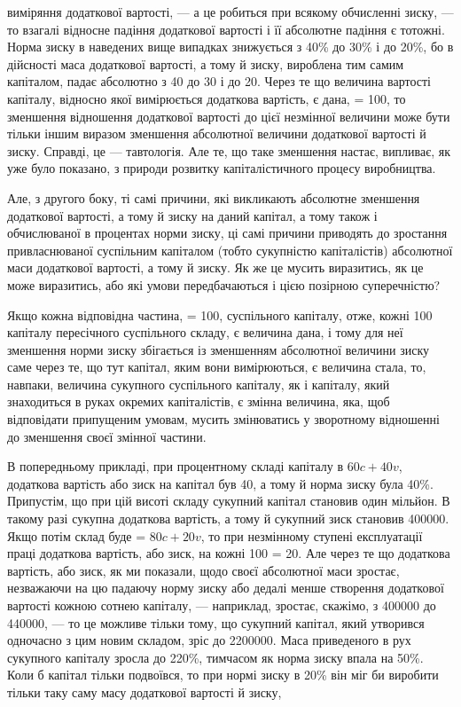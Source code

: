 \parcont{}  %
виміряння додаткової вартості, — а це робиться при всякому
обчисленні зиску, — то взагалі відносне падіння додаткової вартості
і її абсолютне падіння є тотожні. Норма зиску в наведених
вище випадках знижується з 40\% до 30\% і до 20\%, бо в дійсності
маса додаткової вартості, а тому й зиску, вироблена тим
самим капіталом, падає абсолютно з 40 до 30 і до 20. Через те
що величина вартості капіталу, відносно якої вимірюється додаткова
вартість, є дана, = 100, то зменшення відношення додаткової
вартості до цієї незмінної величини може бути тільки іншим
виразом зменшення абсолютної величини додаткової вартості
й зиску. Справді, це — тавтологія. Але те, що таке зменшення
настає, випливає, як уже було показано, з природи розвитку
капіталістичного процесу виробництва.

Але, з другого боку, ті самі причини, які викликають абсолютне
зменшення додаткової вартості, а тому й зиску на даний
капітал, а тому також і обчислюваної в процентах норми зиску,
ці самі причини приводять до зростання привласнюваної суспільним
капіталом (тобто сукупністю капіталістів) абсолютної маси
додаткової вартості, а тому й зиску. Як же це мусить виразитись,
як це може виразитись, або які умови передбачаються
і цією позірною суперечністю?

Якщо кожна відповідна частина, = 100, суспільного капіталу,
отже, кожні 100 капіталу пересічного суспільного складу, є величина
дана, і тому для неї зменшення норми зиску збігається
із зменшенням абсолютної величини зиску саме через те, що
тут капітал, яким вони вимірюються, є величина стала, то,
навпаки, величина сукупного суспільного капіталу, як і капіталу,
який знаходиться в руках окремих капіталістів, є змінна
величина, яка, щоб відповідати припущеним умовам, мусить
змінюватись у зворотному відношенні до зменшення своєї змінної
частини.

В попередньому прикладі, при процентному складі капіталу
в $60c + 40v$, додаткова вартість або зиск на капітал був 40,
а тому й норма зиску була 40\%. Припустім, що при цій висоті
складу сукупний капітал становив один мільйон. В такому разі
сукупна додаткова вартість, а тому й сукупний зиск становив
400000. Якщо потім склад буде = $80c + 20v$, то при незмінному
ступені експлуатації праці додаткова вартість, або зиск, на кожні
100 = 20. Але через те що додаткова вартість, або зиск, як ми
показали, щодо своєї абсолютної маси зростає, незважаючи на цю
падаючу норму зиску або дедалі менше створення додаткової
вартості кожною сотнею капіталу, — наприклад, зростає, скажімо,
з 400000 до 440000, — то це можливе тільки тому, що сукупний
капітал, який утворився одночасно з цим новим складом, зріс
до 2200000. Маса приведеного в рух сукупного капіталу зросла
до 220\%, тимчасом як норма зиску впала на 50\%. Коли б капітал
тільки подвоївся, то при нормі зиску в 20\% він міг би
виробити тільки таку саму масу додаткової вартості й зиску,
\parbreak{}  %
